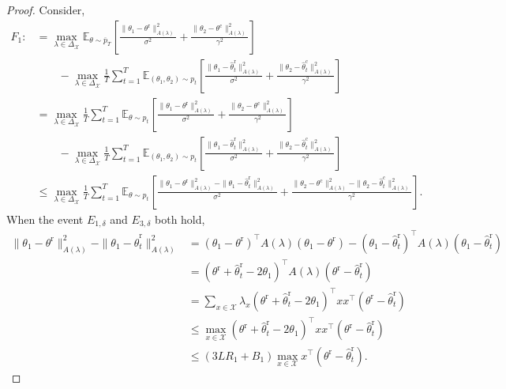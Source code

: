 \documentclass[accepted]{uai2025} %
\theoremstyle{plain}
\theoremstyle{definition}
\theoremstyle{remark}
\newcommand{\thetar}{\theta^{\mathrm{r}}}
\newcommand{\hthetact}{\hat{\theta}_t^{\mathrm{c}}}
\newcommand{\hthetart}{\hat{\theta}_t^{\mathrm{r}}}
\begin{document}
\begin{proof}
Consider,
\begin{align*}
        F_1:&=\max_{\lambda \in \Delta_{\mathcal{X}}} \mathbb{E}_{\theta \sim \overline{p}_{T}} 
\left[ \frac{\|\theta_1 - \theta^\mathrm{r}\|_{A(\lambda)}^2}{\sigma^2} 
+ \frac{\|\theta_2 - \theta^\mathrm{c}\|_{{A}(\lambda)}^2}{\gamma^2} \right] \\ 
&\qquad- \max_{\lambda \in \Delta_{\mathcal{X}}} \frac{1}{T} 
\sum_{t=1}^{T} \mathbb{E}_{(\theta_1, \theta_2) \sim p_t} 
\left[ \frac{\|\theta_1 - \hthetart\|_{A(\lambda)}^2}{\sigma^2} 
+ \frac{\|\theta_2 - \hthetact\|_{{A}(\lambda)}^2}{\gamma^2} \right]
\\&=\max_{\lambda \in \Delta_{\mathcal{X}}} \frac{1}{T}\sum_{t=1}^T\mathbb{E}_{\theta \sim {p}_{t}} 
\left[ \frac{\|\theta_1 - \theta^\mathrm{r}\|_{A(\lambda)}^2}{\sigma^2} + \frac{\|\theta_2 - \theta^\mathrm{c}\|_{{A}(\lambda)}^2}{\gamma^2} \right] \\ 
&\qquad 
- \max_{\lambda \in \Delta_{\mathcal{X}}} \frac{1}{T} 
\sum_{t=1}^{T} \mathbb{E}_{(\theta_1, \theta_2) \sim p_t} 
\left[ \frac{\|\theta_1 - \hthetart\|_{A(\lambda)}^2}{\sigma^2} 
+ \frac{\|\theta_2 - \hthetact\|_{{A}(\lambda)}^2}{\gamma^2} \right]
\\&\le \max_{\lambda \in \Delta_{\mathcal{X}}} \frac{1}{T}\sum_{t=1}^T\mathbb{E}_{\theta \sim {p}_{t}} 
\left[ \frac{\|\theta_1 - \theta^\mathrm{r}\|_{A(\lambda)}^2-\|\theta_1 - \hthetart\|_{A(\lambda)}^2}{\sigma^2} 
+ \frac{\|\theta_2 - \theta^\mathrm{c}\|_{{A}(\lambda)}^2-\|\theta_2 - \hthetact\|_{{A}(\lambda)}^2}{\gamma^2} \right] .
    \end{align*}
When the event $E_{1,\delta}$ and $E_{3,\delta}$ both hold,
\begin{align*}
\| \theta_1 - \theta^\mathrm{r} \|^2_{A(\lambda)} - \| \theta_1 - \hat{\theta}_t^\mathrm{r} \|^2_{A(\lambda)} 
&= (\theta_1 - \theta^\mathrm{r})^{\top} A(\lambda) (\theta_1 - \theta^\mathrm{r}) - (\theta_1 - \hat{\theta}_t^\mathrm{r})^{\top} A(\lambda) (\theta_1 - \hat{\theta}_t^\mathrm{r}) \\
&= (\thetar + \hat{\theta}_t^\mathrm{r} - 2\theta_1)^{\top} A(\lambda) (\thetar - \hat{\theta}_t^\mathrm{r}) \\
&= \sum_{x \in \mathcal{X}} \lambda_x (\thetar + \hat{\theta}_t^\mathrm{r} - 2\theta_1)^{\top} x x^{\top} (\thetar - \hat{\theta}_t^\mathrm{r}) \\
&\le \max_{x \in \mathcal{X}} (\thetar + \hat{\theta}_t^\mathrm{r} - 2\theta_1)^{\top} x x^{\top} (\thetar - \hat{\theta}_t^\mathrm{r})\\
&\le (3L R_1+B_1)\max_{x\in\mathcal{X}} x^\top(\thetar-\hat{\theta}_t^\mathrm{r}).
\end{align*}


\end{proof}
\end{document}
